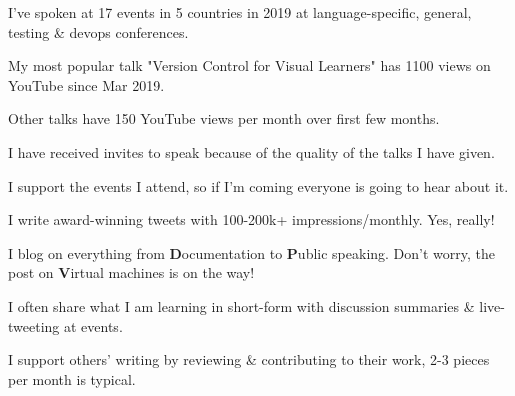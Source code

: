\documentclass[letterpaper]{deedy-resume} %
\begin{document}
\begin{minipage}[t]{0.66\textwidth}

\vspace{\topsep} %
\begin{tightitemize}
\item I've spoken at 17 events in 5 countries in 2019 at language-specific, general, testing \& devops conferences.
\item My most popular talk "Version Control for Visual Learners" has 1100 views on YouTube since Mar 2019.
\item Other talks have 150 YouTube views per month over first few months.
\item I have received invites to speak because of the quality of the talks I have given.
\end{tightitemize}

\sectionspace %


\begin{tightitemize}
\item I support the events I attend, so if I'm coming everyone is going to hear about it.
\item I write award-winning tweets with 100-200k+ impressions/monthly. Yes, really!
\end{tightitemize}

\sectionspace %


\begin{tightitemize}
\item I blog on everything from \textbf{D}ocumentation to \textbf{P}ublic speaking. Don't worry, the post on \textbf{V}irtual machines is on the way!
\item I often share what I am learning in short-form with discussion summaries \& live-tweeting at events.
\item I support others' writing by reviewing \& contributing to their work, 2-3 pieces per month is typical.
\end{tightitemize}


\end{minipage}
\end{document}
